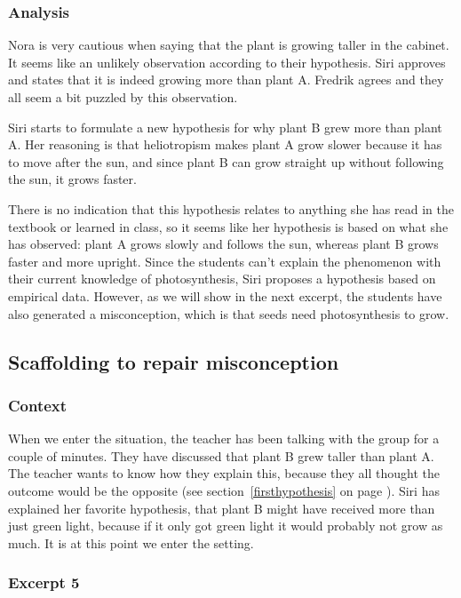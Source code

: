 \subsubsection*{Analysis}
Nora is very cautious when saying that the plant is growing taller in the cabinet. It seems like an unlikely observation according to their hypothesis. Siri approves and states that it is indeed growing more than plant A. Fredrik agrees and they all seem a bit puzzled by this observation.

Siri starts to formulate a new hypothesis for why plant B grew more than plant A. Her reasoning is that heliotropism makes plant A grow slower because it has to move after the sun, and since plant B can grow straight up without following the sun, it grows faster. 

There is no indication that this hypothesis relates to anything she has read in the textbook or learned in class, so it seems like her hypothesis is based on what she has observed: plant A grows slowly and follows the sun, whereas plant B grows faster and more upright. Since the students can't explain the phenomenon with their current knowledge of photosynthesis, Siri proposes a hypothesis based on empirical data. However, as we will show in the next excerpt, the students have also generated a misconception, which is that seeds need photosynthesis to grow.


\subsection{Scaffolding to repair misconception}

\subsubsection*{Context}
When we enter the situation, the teacher has been talking with the group for a couple of minutes. They have discussed that plant B grew taller than plant A. The teacher wants to know how they explain this, because they all thought the outcome would be the opposite (see section~\ref{firsthypothesis} on page \pageref{firsthypothesis}). Siri has explained her favorite hypothesis, that plant B might have received more than just green light, because if it only got green light it would probably not grow as much.  It is at this point we enter the setting.
 
\subsubsection*{Excerpt 5}\label{ex:excerpt5}

